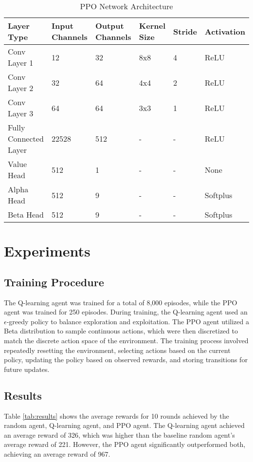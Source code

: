\documentclass[final,numbers]{article}
\begin{document}
\begin{table}[h]
\centering
\begin{tabular}{@{}llllll@{}}
\toprule
Layer Type            & Input Channels & Output Channels & Kernel Size & Stride & Activation \\ \midrule
Conv Layer 1          & 12             & 32              & 8x8         & 4      & ReLU       \\
Conv Layer 2          & 32             & 64              & 4x4         & 2      & ReLU       \\
Conv Layer 3          & 64             & 64              & 3x3         & 1      & ReLU       \\
Fully Connected Layer & 22528          & 512             & -           & -      & ReLU       \\
Value Head            & 512            & 1               & -           & -      & None       \\
Alpha Head            & 512            & 9               & -           & -      & Softplus   \\
Beta Head             & 512            & 9               & -           & -      & Softplus   \\ \bottomrule
\end{tabular}
\caption{PPO Network Architecture}
\label{tab:ppo_architecture}
\end{table}

\section{Experiments}
\subsection{Training Procedure}
The Q-learning agent was trained for a total of 8,000 episodes, while the PPO agent was trained for 250 episodes. During training, the Q-learning agent used an $\epsilon$-greedy policy to balance exploration and exploitation. The PPO agent utilized a Beta distribution to sample continuous actions, which were then discretized to match the discrete action space of the environment. The training process involved repeatedly resetting the environment, selecting actions based on the current policy, updating the policy based on observed rewards, and storing transitions for future updates.

\subsection{Results}
Table \ref{tab:results} shows the average rewards for 10 rounds achieved by the random agent, Q-learning agent, and PPO agent. The Q-learning agent achieved an average reward of 326, which was higher than the baseline random agent's average reward of 221. However, the PPO agent significantly outperformed both, achieving an average reward of 967.
\end{document}
